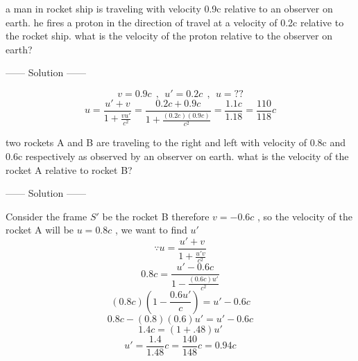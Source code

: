 \documentclass{article}
\begin{document}
\begin{example}
a man in rocket ship is traveling with velocity 0.9c relative to an observer on earth.
he fires a proton in the direction of travel at a velocity of 0.2c relative to the rocket ship. what is the velocity of the proton relative to the observer on earth?
\begin{center}
    ------ \textcolor{Solution}{Solution} ------
\end{center}
\[
    v = 0.9c \ \ , \ \ u' = 0.2c \ \ , \ \ u = ??    
\]
\[
u = \frac{u' + v}{1 + \frac{vu'}{c^2}} = \frac{0.2c + 0.9c}{1 + \frac{(0.2c)(0.9c)}{c^2}} = \frac{1.1c}{1.18} = \frac{110}{118}c
\]
\end{example}
\begin{example}
    two rockets A and B are traveling to the right and left with velocity of 0.8c and 0.6c respectively as observed by an observer on earth. what is the velocity of the rocket A relative to rocket B?
\begin{center}
    ------ \textcolor{Solution}{Solution} ------
\end{center}

\begin{center}
\end{center}
Consider the frame $S'$ be the rocket B therefore $v =-0.6c$ , so the velocity of the rocket A will be $u = 0.8c$ , we want to find $u'$
\[
\because u = \frac{u'+v}{1+\frac{u'v}{c^2}}    
\]
\[
    0.8c = \frac{u'-0.6c}{1-\frac{(0.6c)u'}{c^2}}    
\]
\[
(0.8c)\left(1-\frac{0.6u'}{c}\right) = u' - 0.6c
\]
\[
    0.8c-(0.8)(0.6)u' = u' - 0.6c
\]
\[
1.4c = (1+.48)u' 
\]
\[
u' =\frac{1.4}{1.48}c = \frac{140}{148}c = 0.94c
\]
\end{example}
\end{document}
